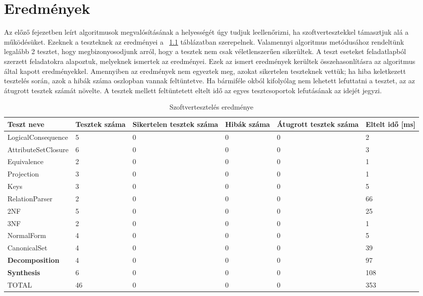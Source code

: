 \chapter{Eredmények}

Az előző fejezetben leírt algoritmusok megvalósításának a helyességét úgy tudjuk leellenőrizni, ha szoftvertesztekkel támasztjuk alá a működésüket. Ezeknek a teszteknek az eredményei a ~\ref{tab:teszt} táblázatban szerepelnek. Valamennyi algoritmus metódusához rendeltünk legalább 2 tesztet, hogy megbizonyosodjunk arról, hogy a tesztek nem csak véletlenszerűen sikerültek. A teszt eseteket feladatlapból \parencite{kordic2018} szerzett feladatokra alapoztuk, melyeknek ismertek az eredményei. Ezek az ismert eredmények kerültek összehasonlításra az algoritmus által kapott eredményekkel. Amennyiben az eredmények nem egyeztek meg, azokat sikertelen teszteknek vettük; ha hiba keletkezett tesztelés során, azok a hibák száma oszlopban vannak feltüntetve. Ha bármiféle okból kifolyólag nem lehetett lefuttatni a tesztet, az az átugrott tesztek számát növelte. A tesztek mellett feltüntetett eltelt idő az egyes tesztcsoportok lefutásának az idejét jegyzi.

\begin{table}
    \centering
    \begin{tabular}{|b{4cm}|b{1.5cm}|b{1.8cm}|b{1.5cm}|b{1.5cm}|b{1.5cm}|}
    \hline
    Teszt neve & Tesztek száma & Sikertelen tesztek száma & Hibák száma & Átugrott tesztek száma & Eltelt idő [ms] \\
    \hline \hline
    LogicalConsequence & 5 & 0 & 0 & 0 & 2 \\ \hline
    AttributeSetClosure & 6 & 0 & 0 & 0 & 3 \\ \hline
    Equivalence & 2 & 0 & 0 & 0 & 1 \\ \hline
    Projection & 3 & 0 & 0 & 0 & 1 \\ \hline
    Keys & 3 & 0 & 0 & 0 & 5 \\ \hline
    RelationParser & 2 & 0 & 0 & 0 & 66 \\ \hline
    2NF & 5 & 0 & 0 & 0 & 25 \\ \hline
    3NF & 2 & 0 & 0 & 0 & 1 \\ \hline
    NormalForm & 4 & 0 & 0 & 0 & 5 \\ \hline
    CanonicalSet & 4 & 0 & 0 & 0 & 39 \\ \hline
    \textbf{Decomposition} & 4 & 0 & 0 & 0 & 97 \\ \hline
    \textbf{Synthesis} & 6 & 0 & 0 & 0 & 108 \\ \hline
    \hline
    TOTAL & 46 & 0 & 0 & 0 & 353 \\ \hline
    \end{tabular}
    \caption{Szoftvertesztelés eredménye}
    \label{tab:teszt}
\end{table}

